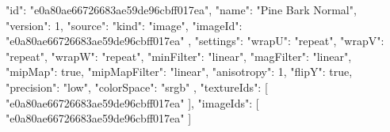 {
  "id": "e0a80ae66726683ae59de96cbff017ea",
  "name": "Pine Bark Normal",
  "version": 1,
  "source": {
    "kind": "image",
    "imageId": "e0a80ae66726683ae59de96cbff017ea"
  },
  "settings": {
    "wrapU": "repeat",
    "wrapV": "repeat",
    "wrapW": "repeat",
    "minFilter": "linear",
    "magFilter": "linear",
    "mipMap": true,
    "mipMapFilter": "linear",
    "anisotropy": 1,
    "flipY": true,
    "precision": "low",
    "colorSpace": "srgb"
  },
  "textureIds": [
    "e0a80ae66726683ae59de96cbff017ea"
  ],
  "imageIds": [
    "e0a80ae66726683ae59de96cbff017ea"
  ]
}

